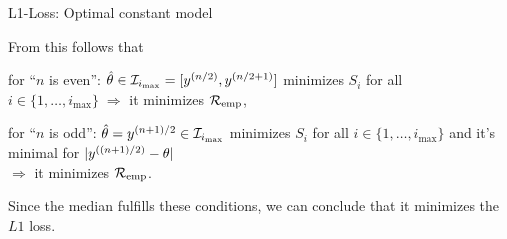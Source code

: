 \documentclass[11pt,compress,t,notes=noshow, xcolor=table]{beamer}
\begin{document}
\begin{frame}{L1-Loss: Optimal constant model}

From this follows that

\vfill

\begin{itemizeL}[sep=5]
\item for \enquote{$n$ is even}: $\thetah \in  \mathcal{I}_{i_{\max}} = [y^{(n/2)},y^{(n/2+1)}]$ minimizes $S_i$ for all $i \in \{1,\dots, i_{\max}\} \; \Rightarrow$  it minimizes $\riske$,
\item for \enquote{$n$ is odd}: $\thetah = y^{(n+1)/2} \in \mathcal{I}_{i_{\max}}$ minimizes $S_i$ for all $i \in \{1,\dots, i_{\max}\}$ and it's minimal for
$|\yi[(n + 1)/2] - \theta|$ \\ $\Rightarrow$
it minimizes $\riske$.
\end{itemizeL}
\vfill
Since the median fulfills these conditions, we can conclude that it minimizes 
the $L1$ loss.


% 
% 




% 
% 

\end{frame}




%   
% 


\endlecture
\end{document}
